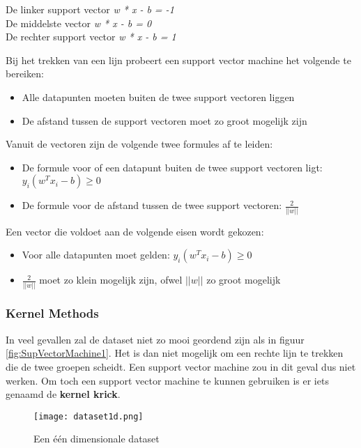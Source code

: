 \begin{center}
De linker support vector	\textit{w * x - b = -1}
\\De middelste vector			\textit{w * x - b = 0}
\\De rechter support vector 	\textit{w * x - b = 1}
\end{center}

Bij het trekken van een lijn probeert een support vector machine het volgende te bereiken:

\begin{itemize}
\item Alle datapunten moeten buiten de twee support vectoren liggen
\item De afstand tussen de support vectoren moet zo groot mogelijk zijn
\end{itemize}


Vanuit de vectoren zijn de volgende twee formules af te leiden:
\begin{itemize}
\item De formule voor of een datapunt buiten de twee support vectoren ligt: $y_{i}(w^{T}x_{i} - b) \geq 0 $
\item De formule voor de afstand tussen de twee support vectoren: $\frac{2}{||w||}$
\end{itemize} 


Een vector die voldoet aan de volgende eisen wordt gekozen:
\begin{itemize}
\item Voor alle datapunten moet gelden: $y_{i}(w^{T}x_{i} - b) \geq 0 $
\item $\frac{2}{||w||}$ moet zo klein mogelijk zijn, ofwel $||w||$ zo groot mogelijk
\end{itemize}



\subsubsection{Kernel Methods}
In veel gevallen zal de dataset niet zo mooi geordend zijn als in figuur \ref{fig:SupVectorMachine1}. Het is dan niet mogelijk om een rechte lijn te trekken die de twee groepen scheidt. Een support vector machine zou in dit geval dus niet werken. Om toch een support vector machine te kunnen gebruiken is er iets genaamd de \textbf{kernel krick}.

\begin{figure}[h]
  \centering
    \texttt{[image: dataset1d.png]}
  \caption{Een \'{e}\'{e}n dimensionale dataset}
  \label{fig:SupVectorMachine2}
\end{figure}

